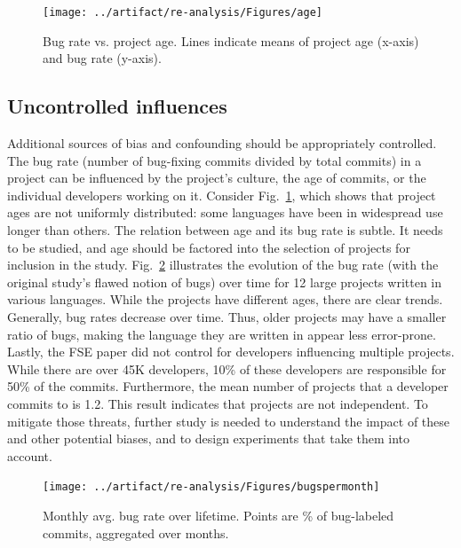 \documentclass[acmsmall]{acmart}
\begin{document}
\begin{figure}[!h]\texttt{[image: ../artifact/re-analysis/Figures/age]}
\vspace{-3mm}
\caption{Bug rate vs. project age. Lines indicate means of project age
  (x-axis) and bug rate (y-axis).}\label{age}
\end{figure}

\subsection{Uncontrolled influences} 

Additional sources of bias and confounding should be appropriately
controlled. The bug rate (number of bug-fixing commits divided by total
commits) in a project can be influenced by the project's culture, the age of
commits, or the individual developers working on it.  Consider
Fig.~\ref{age}, which shows that project ages are not uniformly distributed:
some languages have been in widespread use longer than others.  The relation
between age and its bug rate is subtle. It needs to be studied, and age
should be factored into the selection of projects for inclusion in the
study. Fig.~\ref{evolution} illustrates the evolution of the bug rate (with
the original study's flawed notion of bugs) over time for 12 large projects
written in various languages. While the projects have different ages, there
are clear trends. Generally, bug rates decrease over time. Thus, older
projects may have a smaller ratio of bugs, making the language they are
written in appear less error-prone. Lastly, the FSE paper did not control
for developers influencing multiple projects. While there are over 45K
developers, 10\% of these developers are responsible for 50\% of the
commits.  Furthermore, the mean number of projects that a developer commits
to is 1.2. This result indicates that projects are not independent. To
mitigate those threats, further study is needed to understand the impact of
these and other potential biases, and to design experiments that take them
into account.

\begin{figure}[!h]
\texttt{[image: ../artifact/re-analysis/Figures/bugspermonth]}
\vspace{-3mm}
\caption{Monthly avg. bug rate over lifetime. Points are
 \% of bug-labeled commits, aggregated over months.}\label{evolution}
\end{figure}
\end{document}

